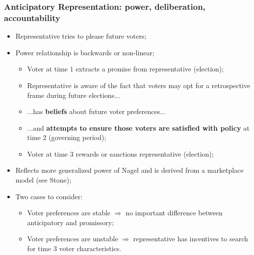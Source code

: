 \documentclass[aspectratio=169]{beamer}
\theoremstyle{principle}
\begin{document}
\begin{frame}
\frametitle{Anticipatory Representation: power, deliberation, accountability}
\begin{itemize}
\item Representative tries to please future voters;
\bigskip
\item Power relationship is backwards or non-linear;
\begin{itemize}
\item Voter at time $1$ extracts a promise from representative (election);
\item Representative is aware of the fact that voters may opt for a retrospective frame during future elections...
\item ...has \textbf{beliefs} about future voter preferences...
\item ...and \textbf{attempts to ensure those voters are satisfied with policy} at time 2 (governing period);
\item Voter at time $3$ rewards or sanctions representative (election);
\end{itemize}
\bigskip
\item Reflects more generalized power of Nagel and is derived from a marketplace model (see Stone); 
\bigskip
\item Two cases to consider:
\begin{itemize}
\item Voter preferences are stable $\Rightarrow$ no important difference between anticipatory and promissory;
\item Voter preferences are unstable $\Rightarrow$ representative has incentives to search for time 3 voter characteristics.
\end{itemize}
\end{itemize}

\end{frame}
\end{document}
